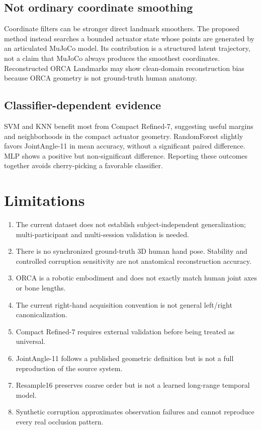 \documentclass[11pt]{article}
\begin{document}
\subsection{Not ordinary coordinate smoothing}
Coordinate filters can be stronger direct landmark smoothers. The proposed method instead searches a bounded actuator state whose points are generated by an articulated MuJoCo model. Its contribution is a structured latent trajectory, not a claim that MuJoCo always produces the smoothest coordinates. Reconstructed ORCA Landmarks may show clean-domain reconstruction bias because ORCA geometry is not ground-truth human anatomy.

\subsection{Classifier-dependent evidence}
SVM and KNN benefit most from Compact Refined-7, suggesting useful margins and neighborhoods in the compact actuator geometry. RandomForest slightly favors JointAngle-11 in mean accuracy, without a significant paired difference. MLP shows a positive but non-significant difference. Reporting these outcomes together avoids cherry-picking a favorable classifier.

\section{Limitations}
\begin{enumerate}[leftmargin=*]
\item The current dataset does not establish subject-independent generalization; multi-participant and multi-session validation is needed.
\item There is no synchronized ground-truth 3D human hand pose. Stability and controlled corruption sensitivity are not anatomical reconstruction accuracy.
\item ORCA is a robotic embodiment and does not exactly match human joint axes or bone lengths.
\item The current right-hand acquisition convention is not general left/right canonicalization.
\item Compact Refined-7 requires external validation before being treated as universal.
\item JointAngle-11 follows a published geometric definition but is not a full reproduction of the source system.
\item Resample16 preserves coarse order but is not a learned long-range temporal model.
\item Synthetic corruption approximates observation failures and cannot reproduce every real occlusion pattern.
\end{enumerate}
\end{document}
